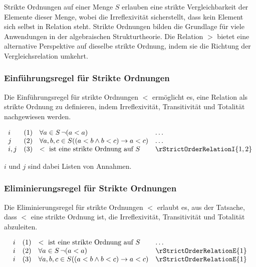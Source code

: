 \documentclass[main.tex]{subfiles}
\begin{document}
\begin{remark}
    Strikte Ordnungen auf einer Menge \( S \) erlauben eine strikte Vergleichbarkeit der Elemente dieser Menge, wobei die Irreflexivität sicherstellt, dass kein Element sich selbst in Relation steht. Strikte Ordnungen bilden die Grundlage für viele Anwendungen in der algebraischen Strukturtheorie. Die Relation \(>\) bietet eine alternative Perspektive auf dieselbe strikte Ordnung, indem sie die Richtung der Vergleichsrelation umkehrt.
\end{remark}

\subsubsection*{Einführungsregel für Strikte Ordnungen}
\label{rule:rStrictOrderRelationI}
Die Einführungsregel für strikte Ordnungen \(<\) ermöglicht es, eine Relation als strikte Ordnung zu definieren, indem Irreflexivität, Transitivität und Totalität nachgewiesen werden.

\[
\begin{array}{llll}
    i       & (1) & \forall a \in S \, \neg (a < a) & \dots \\
    j       & (2) & \forall a, b, c \in S ((a < b \land b < c) \rightarrow a < c) & \dots \\
    i,j     & (3) & < \text{ ist eine strikte Ordnung auf } S & \rStrictOrderRelationI{1,2}
\end{array}
\]

\(i\) und \(j\) sind dabei Listen von Annahmen.

\subsubsection*{Eliminierungsregel für Strikte Ordnungen}
\label{rule:rStrictOrderRelationE}
Die Eliminierungsregel für strikte Ordnungen \(<\) erlaubt es, aus der Tatsache, dass \(<\) eine strikte Ordnung ist, die Irreflexivität, Transitivität und Totalität abzuleiten.

\[
\begin{array}{llll}
    i       & (1) & < \text{ ist eine strikte Ordnung auf } S & \dots \\
    i       & (2) & \forall a \in S \, \neg (a < a) & \rStrictOrderRelationE{1} \\
    i       & (3) & \forall a, b, c \in S ((a < b \land b < c) \rightarrow a < c) & \rStrictOrderRelationE{1} \\
\end{array}
\]
\end{document}
